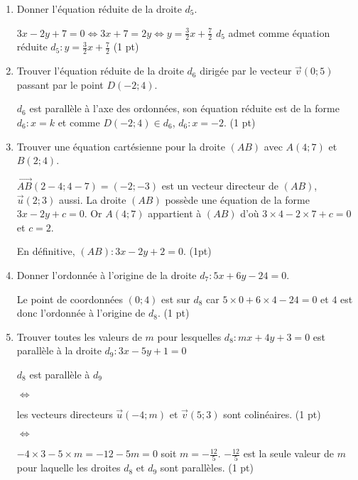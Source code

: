 \documentclass[a4paper,11pt]{article}
\theoremstyle{break}
\begin{document}
\begin{exo}
\begin{enumerate}
\begin{correction}
\end{correction}    
    
    \item Donner l'équation réduite de la droite $d_5$.

\begin{correction}
    
 $3x-2y+7=0 \Leftrightarrow 3x+7=2y \Leftrightarrow y=\frac{3}{2}x+\frac{7}{2}$
   $d_5$ admet comme \'equation r\'eduite $d_5:y=\frac{3}{2}x+\frac{7}{2}$ (1 pt)

\end{correction}
   
    \item Trouver l'équation réduite de la droite $d_6$ dirigée par le vecteur $\vec{v}(0;5)$ 
    passant par le point $D(-2;4)$.
    
\begin{correction}
 $d_6$ est parall\`ele \`a l'axe des ordonn\'ees, son \'equation r\'eduite est de la forme $d_6:x=k$ et comme $D(-2;4) \in d_6$,
 $d_6:x=-2$. (1 pt)
\end{correction}
   
\item Trouver une équation cartésienne pour la droite $(AB)$ avec $A(4;7)$ et $B(2;4)$.

\begin{correction}
 $\vec{AB}(2-4;4-7)=(-2;-3)$ est un vecteur directeur de $(AB)$, $\vec{u}(2;3)$ aussi. La droite $(AB)$ poss\`ede une \'equation
 de la forme $3x-2y+c=0$. Or $A(4;7)$ appartient \`a $(AB)$ d'o\`u $3 \times 4-2 \times 7+c=0$ et $c=2$. 
 
 En d\'efinitive, $(AB):3x-2y+2=0$. (1pt)
\end{correction}
    
\item Donner l'ordonnée à l'origine de la droite $d_7:5x+6y-24=0$.
    
\begin{correction}
  Le point de coordonn\'ees $(0;4)$ est sur $d_8$ car $5 \times 0 +6 \times 4-24=0$ et $4$ est donc l'ordonn\'ee \`a 
  l'origine de $d_8$. (1 pt)
\end{correction}

    \item Trouver toutes les valeurs de $m$ pour lesquelles $d_8:mx+4y+3=0$ est parall\`ele 
    à la droite $d_9:3x-5y+1=0$

\begin{correction}
 $d_8$ est parall\`ele \`a $d_9$ 
 
 $\Leftrightarrow$
 
 les vecteurs directeurs $\vec{u}(-4;m)$ et $\vec{v}(5;3)$ sont colin\'eaires. (1 pt)
 
 $\Leftrightarrow$
 
 $-4 \times 3-5 \times m=-12-5m=0$ soit $m=-\frac{12}{5}$. $-\frac{12}{5}$ est la seule valeur de $m$ pour laquelle 
 les droites $d_8$ et $d_9$ sont parall\`eles. (1 pt)
\end{correction}

\end{enumerate}
  \end{exo}
    
\end{document}
